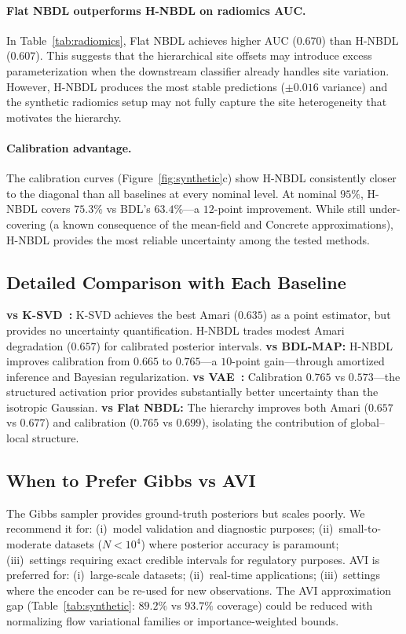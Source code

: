 \documentclass[11pt,a4paper]{article}
\theoremstyle{definition}
\begin{document}
\paragraph{Flat NBDL outperforms H-NBDL on radiomics AUC.} In Table~\ref{tab:radiomics}, Flat NBDL achieves higher AUC ($0.670$) than H-NBDL ($0.607$). This suggests that the hierarchical site offsets may introduce excess parameterization when the downstream classifier already handles site variation. However, H-NBDL produces the most stable predictions ($\pm 0.016$ variance) and the synthetic radiomics setup may not fully capture the site heterogeneity that motivates the hierarchy.

\paragraph{Calibration advantage.} The calibration curves (Figure~\ref{fig:synthetic}c) show H-NBDL consistently closer to the diagonal than all baselines at every nominal level. At nominal $95\%$, H-NBDL covers $75.3\%$ vs BDL's $63.4\%$---a $12$-point improvement. While still under-covering (a known consequence of the mean-field and Concrete approximations), H-NBDL provides the most reliable uncertainty among the tested methods.

\subsection{Detailed Comparison with Each Baseline}

\textbf{vs K-SVD~\citep{aharon2006}:} K-SVD achieves the best Amari ($0.635$) as a point estimator, but provides no uncertainty quantification. H-NBDL trades modest Amari degradation ($0.657$) for calibrated posterior intervals. \textbf{vs BDL-MAP:} H-NBDL improves calibration from $0.665$ to $0.765$---a $10$-point gain---through amortized inference and Bayesian regularization. \textbf{vs VAE~\citep{kingma2014}:} Calibration $0.765$ vs $0.573$---the structured activation prior provides substantially better uncertainty than the isotropic Gaussian. \textbf{vs Flat NBDL:} The hierarchy improves both Amari ($0.657$ vs $0.677$) and calibration ($0.765$ vs $0.699$), isolating the contribution of global--local structure.

\subsection{When to Prefer Gibbs vs AVI}

The Gibbs sampler provides ground-truth posteriors but scales poorly. We recommend it for: (i)~model validation and diagnostic purposes; (ii)~small-to-moderate datasets ($N < 10^4$) where posterior accuracy is paramount; (iii)~settings requiring exact credible intervals for regulatory purposes. AVI is preferred for: (i)~large-scale datasets; (ii)~real-time applications; (iii)~settings where the encoder can be re-used for new observations. The AVI approximation gap (Table~\ref{tab:synthetic}: $89.2\%$ vs $93.7\%$ coverage) could be reduced with normalizing flow variational families or importance-weighted bounds.
\end{document}

